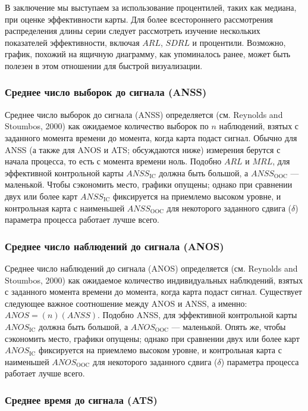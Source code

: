 В заключение мы выступаем за использование процентилей, таких как медиана, при оценке эффективности карты. Для более всестороннего рассмотрения распределения длины серии следует рассмотреть изучение нескольких показателей эффективности, включая \(ARL\), \(SDRL\) и процентили. Возможно, график, похожий на ящичную диаграмму, как упоминалось ранее, может быть полезен в этом отношении для быстрой визуализации.

\subsubsection{Среднее число выборок до сигнала (ANSS)}

Среднее число выборок до сигнала (ANSS) определяется (см. Reynolds and Stoumbos, 2000) как ожидаемое количество выборок по \(n\) наблюдений, взятых с заданного момента времени до момента, когда карта подаст сигнал. Обычно для ANSS (а также для ANOS и ATS; обсуждаются ниже) измерения берутся с начала процесса, то есть с момента времени ноль. Подобно \(ARL\) и \(MRL\), для эффективной контрольной карты \(ANSS_{\text{IC}}\) должна быть большой, а \(ANSS_{\text{OOC}}\) — маленькой. Чтобы сэкономить место, графики опущены; однако при сравнении двух или более карт \(ANSS_{\text{IC}}\) фиксируется на приемлемо высоком уровне, и контрольная карта с наименьшей \(ANSS_{\text{OOC}}\) для некоторого заданного сдвига (\(\delta\)) параметра процесса работает лучше всего.

\subsubsection{Среднее число наблюдений до сигнала (ANOS)}

Среднее число наблюдений до сигнала (ANOS) определяется (см. Reynolds and Stoumbos, 2000) как ожидаемое количество индивидуальных наблюдений, взятых с заданного момента времени до момента, когда карта подаст сигнал. Существует следующее важное соотношение между ANOS и ANSS, а именно: \(ANOS = (n)(ANSS)\). Подобно ANSS, для эффективной контрольной карты \(ANOS_{\text{IC}}\) должна быть большой, а \(ANOS_{\text{OOC}}\) — маленькой. Опять же, чтобы сэкономить место, графики опущены; однако при сравнении двух или более карт \(ANOS_{\text{IC}}\) фиксируется на приемлемо высоком уровне, и контрольная карта с наименьшей \(ANOS_{\text{OOC}}\) для некоторого заданного сдвига (\(\delta\)) параметра процесса работает лучше всего.

\subsubsection{Среднее время до сигнала (ATS)}

